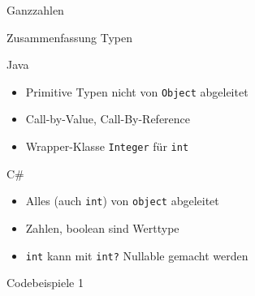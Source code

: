 \documentclass[11pt]{beamer}
\begin{document}
\begin{frame}{Ganzzahlen}

\end{frame}

\begin{frame}{Zusammenfassung Typen}
\begin{multicols}{2}
Java \\
\begin{itemize}
\item Primitive Typen nicht von \texttt{Object} abgeleitet
\item Call-by-Value, Call-By-Reference
\item Wrapper-Klasse \texttt{Integer} für \texttt{int}
\end{itemize}

\columnbreak


C\#\\
\begin{itemize}
\item Alles (auch \texttt{int}) von \texttt{object} abgeleitet
\item Zahlen, boolean sind \glqq{}Werttype\grqq{}
\item \texttt{int} kann mit \texttt{int?} Nullable gemacht werden
\end{itemize}
\end{multicols}
\end{frame}

\begin{frame}{Codebeispiele 1}


\end{frame}
\end{document}
